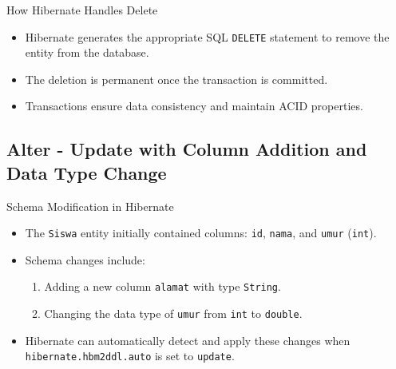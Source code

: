 \documentclass[aspectratio=169, table]{beamer}
\begin{document}
\begin{frame}{How Hibernate Handles Delete}
	\vspace{20pt}
	\begin{itemize}
		\item Hibernate generates the appropriate SQL \texttt{DELETE} statement to remove the entity from the database.
		\item The deletion is permanent once the transaction is committed.
		\item Transactions ensure data consistency and maintain ACID properties.
	\end{itemize}
\end{frame}

\subsection{Alter - Update with Column Addition and Data Type Change}

\begin{frame}{Schema Modification in Hibernate}
	\vspace{20pt}
	\begin{itemize}
		\item The \texttt{Siswa} entity initially contained columns: \texttt{id}, \texttt{nama}, and \texttt{umur} (\texttt{int}).
		\item Schema changes include:
		\begin{enumerate}
			\item Adding a new column \texttt{alamat} with type \texttt{String}.
			\item Changing the data type of \texttt{umur} from \texttt{int} to \texttt{double}.
		\end{enumerate}
		\item Hibernate can automatically detect and apply these changes when \texttt{hibernate.hbm2ddl.auto} is set to \texttt{update}.
	\end{itemize}
\end{frame}
\end{document}
